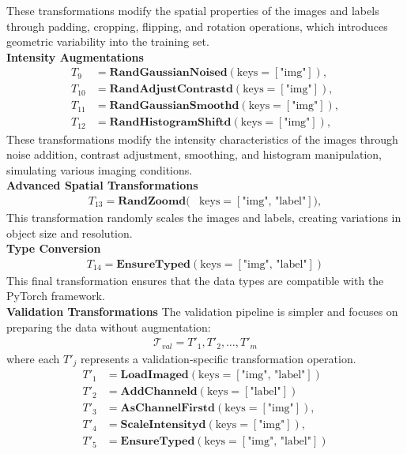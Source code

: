 \documentclass[]{article}
\begin{document}
These transformations modify the spatial properties of the images and labels through padding, cropping, flipping, and rotation operations, which introduces geometric variability into the training set.\\
\textbf{Intensity Augmentations}
\begin{align}
    T_9 &= \textbf{RandGaussianNoised}(\text{keys}=[\text{"img"}]),\\ %
    T_{10} &= \textbf{RandAdjustContrastd}(\text{keys}=[\text{"img"}]),\\ %
    T_{11} &= \textbf{RandGaussianSmoothd}(\text{keys}=[\text{"img"}]),\\ %
    T_{12} &= \textbf{RandHistogramShiftd}(\text{keys}=[\text{"img"}]), %
\end{align}
These transformations modify the intensity characteristics of the images through noise addition, contrast adjustment, smoothing, and histogram manipulation, simulating various imaging conditions.\\
\textbf{Advanced Spatial Transformations}
\begin{align}
T_{13} = \textbf{RandZoomd}(&\text{keys}=[\text{"img", "label"}]), %
\end{align}
This transformation randomly scales the images and labels, creating variations in object size and resolution.\\
\textbf{Type Conversion}
\begin{align}
T_{14} = \textbf{EnsureTyped}(\text{keys}=[\text{"img", "label"}])
\end{align}
This final transformation ensures that the data types are compatible with the PyTorch framework.\\
\textbf{Validation Transformations}
The validation pipeline is simpler and focuses on preparing the data without augmentation:
\begin{align}
\mathcal{T}_{val} = {T'_1, T'_2, \ldots, T'_m}
\end{align}
where each $T'_j$ represents a validation-specific transformation operation.
\begin{align}
    T'_1 &= \textbf{LoadImaged}(\text{keys}=[\text{"img", "label"}]) \\
    T'_2 &= \textbf{AddChanneld}(\text{keys}=[\text{"label"}]) \\
    T'_3 &= \textbf{AsChannelFirstd}(\text{keys}=[\text{"img"}]),\\ %
    T'_4 &= \textbf{ScaleIntensityd}(\text{keys}=[\text{"img"}]), \\
    T'_5 &= \textbf{EnsureTyped}(\text{keys}=[\text{"img", "label"}])
\end{align}
\end{document}

